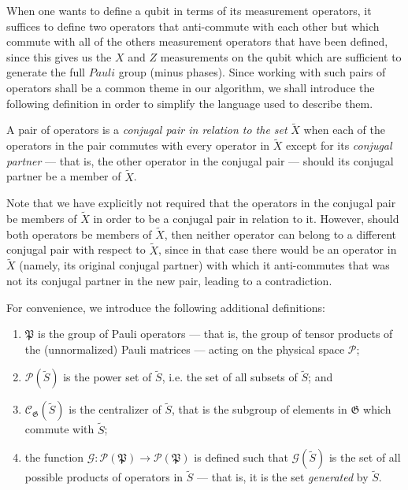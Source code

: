 \documentclass[twocolumn,showpacs,preprintnumbers,amsmath,amssymb,nofootinbib,pra,floatfix]{revtex4-1}
\newenvironment{definition}[1][Definition]{\begin{trivlist}
\item[\hskip \labelsep {\bfseries #1}]}{\end{trivlist}}
\newcommand{\set}{\tilde}
\newcommand{\genfun}{\mathcal{G}}
\newcommand{\pauligroup}{\mathfrak{P}}
\newcommand{\powerset}{\mathcal{P}}
\newcommand{\centralizer}{\mathcal{C}}
\begin{document}
When one wants to define a qubit in terms of its measurement operators, it suffices to define two operators that anti-commute with each other but which commute with all of the others measurement operators that have been defined, since this gives us the $X$ and $Z$ measurements on the qubit which are sufficient to generate the full $Pauli$ group (minus phases).  Since working with such pairs of operators shall be a common theme in our algorithm, we shall introduce the following definition in order to simplify the language used to describe them.

\begin{definition} A pair of operators is a \emph{conjugal pair in relation to the set} $\set X$ when each of the operators in the pair commutes with every operator in $\set X$ except for its \emph{conjugal partner} --- that is, the other operator in the conjugal pair --- should its conjugal partner be a member of $\set X$.
\label{conjugal-pair-definition}
\end{definition}

Note that we have explicitly not required that the operators in the conjugal pair be members of $\set X$ in order to be a conjugal pair in relation to it.  However, should both operators be members of $\set X$, then neither operator can belong to a different conjugal pair with respect to $\set X$, since in that case there would be an operator in $\set X$ (namely, its original conjugal partner) with which it anti-commutes that was not its conjugal partner in the new pair, leading to a contradiction.

For convenience, we introduce the following additional definitions:

\begin{definition}

\begin{enumerate}
\item $\pauligroup$ is the group of Pauli operators --- that is, the group of tensor products of the (unnormalized) Pauli matrices --- acting on the physical space $\mathscr{P}$;
\item $\powerset(\set S)$ is the power set of $\set S$, i.e. the set of all subsets of $\set S$; and
\item $\centralizer_\mathfrak{G}(\set S)$ is the centralizer of $\set S$, that is the subgroup of elements in $\mathfrak{G}$ which commute with $\set S$;
\item the function $\genfun:\powerset(\pauligroup)\to\powerset(\pauligroup)$ is defined such that $\genfun(\set S)$ is the set of all possible products of operators in $\set S$ --- that is, it is the set \emph{generated} by $\set S$.
\end{enumerate}

\end{definition}
\end{document}
